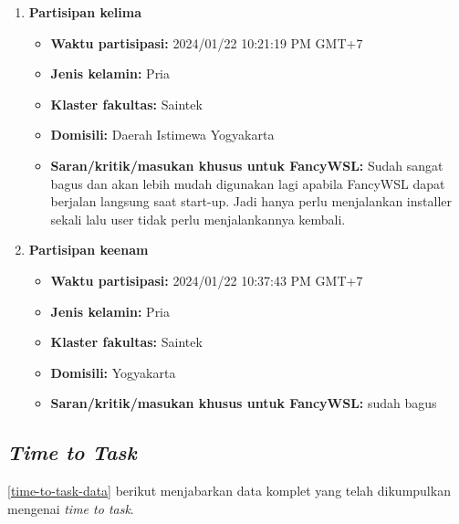 \begin{enumerate}
    \item \textbf{Partisipan kelima}
    \begin{itemize}
        \item \textbf{Waktu partisipasi:} 2024/01/22 10:21:19 PM GMT+7
        \item \textbf{Jenis kelamin:} Pria
        \item \textbf{Klaster fakultas:} Saintek
        \item \textbf{Domisili:} Daerah Istimewa Yogyakarta
        \item \textbf{Saran/kritik/masukan khusus untuk FancyWSL:} Sudah sangat bagus dan akan lebih mudah digunakan lagi apabila FancyWSL dapat berjalan langsung saat start-up. Jadi hanya perlu menjalankan installer sekali lalu user tidak perlu menjalankannya kembali.
    \end{itemize}

    \item \textbf{Partisipan keenam}
    \begin{itemize}
        \item \textbf{Waktu partisipasi:} 2024/01/22 10:37:43 PM GMT+7
        \item \textbf{Jenis kelamin:} Pria
        \item \textbf{Klaster fakultas:} Saintek
        \item \textbf{Domisili:} Yogyakarta
        \item \textbf{Saran/kritik/masukan khusus untuk FancyWSL:} sudah bagus
    \end{itemize}
\end{enumerate}

\subsection{\textit{Time to Task}}

\autoref{time-to-task-data} berikut menjabarkan data komplet yang telah dikumpulkan mengenai \textit{time to task}.

